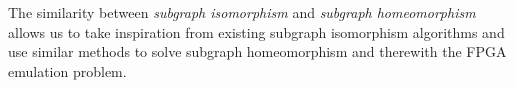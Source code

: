 













The similarity between \textit{subgraph isomorphism} and \textit{subgraph homeomorphism} allows us to take inspiration from existing subgraph isomorphism algorithms and use similar methods to solve subgraph homeomorphism and therewith the FPGA emulation problem.

